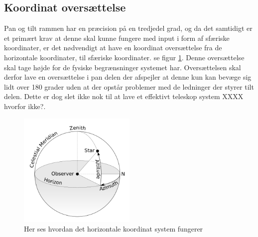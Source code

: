 
\subsection{Koordinat oversættelse}

\label{subsec:koordinat}

Pan og tilt rammen har en præcision på en tredjedel grad, og da det samtidigt er et primært krav at denne skal kunne fungere med input i form af sfæriske koordinater, er det nødvendigt at have en koordinat oversættelse fra de horizontale koordinater, til sfæriske koordinater. se figur \ref{fig:Horizontal}. Denne oversættelse skal tage højde for de fysiske begrænsninger systemet har. Oversættelsen skal derfor lave en oversættelse i pan delen der afspejler at denne kun kan bevæge sig lidt over 180 grader uden at der opstår problemer med de ledninger der styrer tilt delen. Dette er dog slet ikke nok til at lave et effektivt teleskop system XXXX hvorfor ikke?.
\begin{figure}[!h]
	\begin{center}
		\includegraphics[width=0.5\textwidth]{Billeder/Horizontal.png}
	\end{center}		
	\caption{Her ses hvordan det horizontale koordinat system fungerer}
	\label{fig:Horizontal}
\end{figure}

